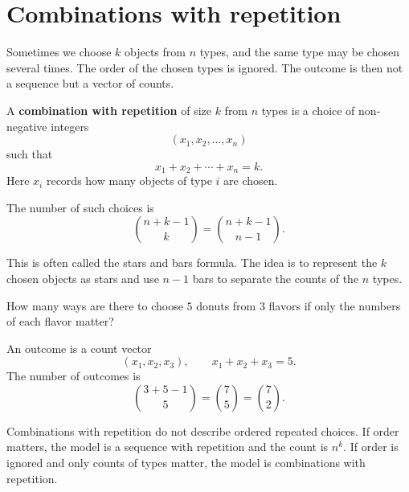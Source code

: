 \section{Combinations with repetition}

Sometimes we choose \(k\) objects from \(n\) types, and the same type may be chosen several times. The order of the chosen types is ignored. The outcome is then not a sequence but a vector of counts.

\begin{definitionbox}
A \textbf{combination with repetition} of size \(k\) from \(n\) types is a choice of non-negative integers
\[
(x_1,x_2,\ldots,x_n)
\]
such that
\[
x_1+x_2+\cdots+x_n=k.
\]
Here \(x_i\) records how many objects of type \(i\) are chosen.
\end{definitionbox}

The number of such choices is
\[
\binom{n+k-1}{k}=\binom{n+k-1}{n-1}.
\]

This is often called the stars and bars formula. The idea is to represent the \(k\) chosen objects as stars and use \(n-1\) bars to separate the counts of the \(n\) types.

\begin{examplebox}
How many ways are there to choose \(5\) donuts from \(3\) flavors if only the numbers of each flavor matter?

An outcome is a count vector
\[
(x_1,x_2,x_3),\qquad x_1+x_2+x_3=5.
\]
The number of outcomes is
\[
\binom{3+5-1}{5}=\binom{7}{5}=\binom{7}{2}.
\]
\end{examplebox}

\begin{remarkbox}
Combinations with repetition do not describe ordered repeated choices. If order matters, the model is a sequence with repetition and the count is \(n^k\). If order is ignored and only counts of types matter, the model is combinations with repetition.
\end{remarkbox}
